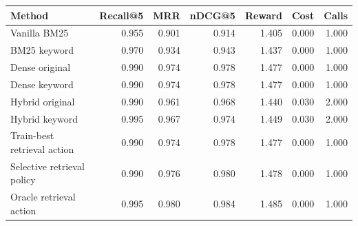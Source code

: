 \begin{tabular}{lrrrrrr}
\toprule
Method & Recall@5 & MRR & nDCG@5 & Reward & Cost & Calls \\
\midrule
Vanilla BM25 & 0.955 & 0.901 & 0.914 & 1.405 & 0.000 & 1.000 \\
BM25 keyword & 0.970 & 0.934 & 0.943 & 1.437 & 0.000 & 1.000 \\
Dense original & 0.990 & 0.974 & 0.978 & 1.477 & 0.000 & 1.000 \\
Dense keyword & 0.990 & 0.974 & 0.978 & 1.477 & 0.000 & 1.000 \\
Hybrid original & 0.990 & 0.961 & 0.968 & 1.440 & 0.030 & 2.000 \\
Hybrid keyword & 0.995 & 0.967 & 0.974 & 1.449 & 0.030 & 2.000 \\
Train-best retrieval action & 0.990 & 0.974 & 0.978 & 1.477 & 0.000 & 1.000 \\
Selective retrieval policy & 0.990 & 0.976 & 0.980 & 1.478 & 0.000 & 1.000 \\
Oracle retrieval action & 0.995 & 0.980 & 0.984 & 1.485 & 0.000 & 1.000 \\
\bottomrule
\end{tabular}
